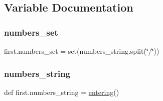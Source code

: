 \subsection{Variable Documentation}
\mbox{\label{namespacefirst_a32fbe2bb8f3fe22505c8cf9f07ee548a}} 
\subsubsection{\texorpdfstring{numbers\+\_\+set}{numbers\_set}}
{\footnotesize\ttfamily first.\+numbers\+\_\+set = set(numbers\+\_\+string.\+split(\char`\"{}/\char`\"{}))}

\mbox{\label{namespacefirst_a23a7415c8888c44472cfa540e83b3add}} 
\subsubsection{\texorpdfstring{numbers\+\_\+string}{numbers\_string}}
{\footnotesize\ttfamily def first.\+numbers\+\_\+string = \hyperlink{namespacefirst_a9a03ddbdeef73f04618eb761fdc39cd1}{entering}()}

